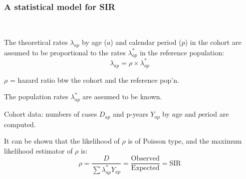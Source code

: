 \documentclass[handout,12pt]{beamer}
\begin{document}
\begin{frame}
\frametitle{A statistical model for SIR}
\ \\
\bi
\item
The theoretical rates $\lambda_{ap}$ by age ($a$)
and calendar period ($p$) in the cohort are assumed to be  
proportional to the rates $\lambda^*_{ap}$ in
the reference population:
$$
   \lambda_{ap} = \rho\times \lambda^*_{ap}  
$$
\item[ ]
$\rho$ = hazard ratio btw the cohort and the reference
pop'n. 
\medskip
\item
The population rates 
$\lambda^*_{ap}$ are assumed to be known.
\medskip
\item
Cohort data: numbers of cases $D_{ap}$ and p-years $Y_{ap}$ by $a$ge and $p$eriod are computed.
\medskip
\item
It can be shown that the likelihood of $\rho$ is of Poisson type, and the maximum likelihood estimator of $\rho$ is:
\[
  \widehat\rho = \frac{D}{\sum \lambda^*_{ap} Y_{ap} } =
  \frac{\mbox{Observed}}{\mbox{Expected}}
  = \text{SIR}
\]

\ei
 
\end{frame}

%
%
%
%
\end{document}
